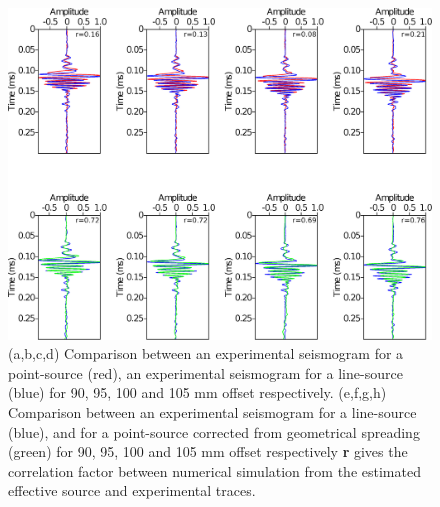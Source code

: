 \documentclass[manuscript,revised]{geophysics}
\begin{document}
\begin{figure}[!h]
	\centering
	\includegraphics[scale=0.4]{fig/panel_bialt_2d3d.eps}
	\caption{(a,b,c,d) Comparison between an experimental seismogram for a point-source (red), an experimental seismogram for a line-source (blue) for 90, 95, 100 and 105 mm offset respectively. (e,f,g,h) Comparison between an experimental seismogram for a line-source (blue), and for a point-source corrected from geometrical spreading (green) for 90, 95, 100 and 105 mm offset respectively \textbf{r} gives the correlation factor between numerical simulation from the estimated effective source and experimental traces.}
	\label{panel_amplitude}
\end{figure}
\end{document}
